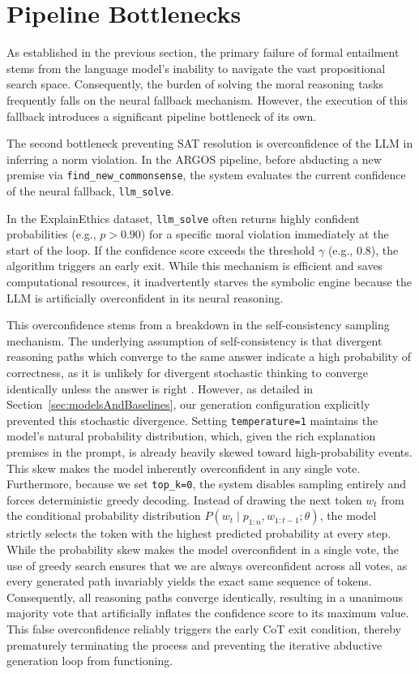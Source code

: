 \section{Pipeline Bottlenecks}
\label{sec:rq2Analysis}
As established in the previous section, the primary failure of formal entailment stems from the language model's inability to navigate the vast propositional search space. Consequently, the burden of solving the moral reasoning tasks frequently falls on the neural fallback mechanism. However, the execution of this fallback introduces a significant pipeline bottleneck of its own.



The second bottleneck preventing SAT resolution is overconfidence of the LLM in inferring a norm violation. In the ARGOS pipeline, before abducting a new premise via \texttt{find\_new\_commonsense}, the system evaluates the current confidence of the neural fallback, \texttt{llm\_solve}.

In the ExplainEthics dataset, \texttt{llm\_solve} often returns highly confident probabilities (e.g., $p > 0.90$) for a specific moral violation immediately at the start of the loop. If the confidence score exceeds the threshold $\gamma$ (e.g., 0.8), the algorithm triggers an early exit. While this mechanism is efficient and saves computational resources, it inadvertently starves the symbolic engine because the LLM is artificially overconfident in its neural reasoning. 

This overconfidence stems from a breakdown in the self-consistency sampling mechanism. The underlying assumption of self-consistency is that divergent reasoning paths which converge to the same answer indicate a high probability of correctness, as it is unlikely for divergent stochastic thinking to converge identically unless the answer is right \citep{wang2022selfconsistency}. However, as detailed in Section~\ref{sec:modelsAndBaselines}, our generation configuration explicitly prevented this stochastic divergence. Setting \texttt{temperature=1} maintains the model's natural probability distribution, which, given the rich explanation premises in the prompt, is already heavily skewed toward high-probability events. This skew makes the model inherently overconfident in any single vote. Furthermore, because we set \texttt{top\_k=0}, the system disables sampling entirely and forces deterministic greedy decoding. Instead of drawing the next token $w_t$ from the conditional probability distribution $P(w_t \mid p_{1:n}, w_{1:t-1}; \theta)$, the model strictly selects the token with the highest predicted probability at every step. While the probability skew makes the model overconfident in a single vote, the use of greedy search ensures that we are always overconfident across all votes, as every generated path invariably yields the exact same sequence of tokens. Consequently, all reasoning paths converge identically, resulting in a unanimous majority vote that artificially inflates the confidence score to its maximum value. This false overconfidence reliably triggers the early CoT exit condition, thereby prematurely terminating the process and preventing the iterative abductive generation loop from functioning.

